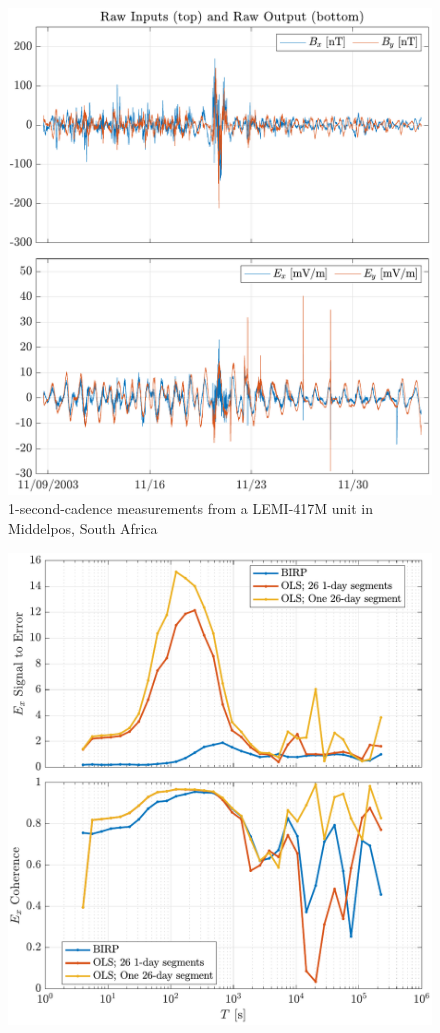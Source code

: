 \documentclass{article}
\begin{document}
\begin{figure}[h!]
\centering
\includegraphics[width=\textwidth]{figures/KAP103/timeseries.pdf}
\caption{1-second-cadence measurements from a LEMI-417M unit in Middelpos, South Africa}
\label{fig:Middelpos_timeseries}
\end{figure}

\begin{figure}[h!]
\centering
\includegraphics[width=\textwidth]{figures/KAP103_Middelpos/SN_compare-E_x.pdf}
\caption{}
\label{fig:SN_Ex_Compare}
\end{figure}
\end{document}

